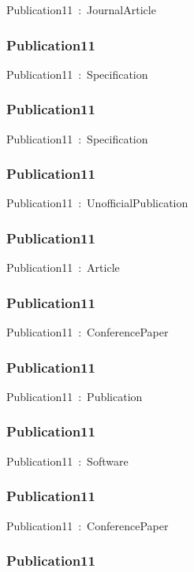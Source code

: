 \documentclass{article}
\begin{document}
Publication11~:~JournalArticle

\subsubsection*{Publication11}

Publication11~:~Specification

\subsubsection*{Publication11}

Publication11~:~Specification

\subsubsection*{Publication11}

Publication11~:~UnofficialPublication

\subsubsection*{Publication11}

Publication11~:~Article

\subsubsection*{Publication11}

Publication11~:~ConferencePaper

\subsubsection*{Publication11}

Publication11~:~Publication

\subsubsection*{Publication11}

Publication11~:~Software

\subsubsection*{Publication11}

Publication11~:~ConferencePaper

\subsubsection*{Publication11}
\end{document}
